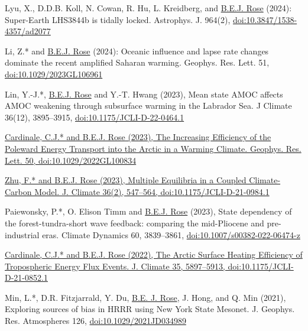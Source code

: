 \documentclass[11pt, letterpaper]{article} %
\newcommand{\years}[1]{\marginnote{\scriptsize #1}} %
\newcommand{\publink}{http://www.atmos.albany.edu/facstaff/brose/resources/Publications/}
\begin{document}
Lyu, X., D.D.B. Koll, N. Cowan, R. Hu, L. Kreidberg, and \underline{B.E.J. Rose} (2024): Super-Earth LHS3844b is tidally locked. Astrophys. J. 964(2), \href{https://doi.org/10.3847/1538-4357/ad2077}{doi:10.3847/1538-4357/ad2077}
\vspace{0.2 cm}

Li, Z.* and \underline{B.E.J. Rose} (2024): Oceanic influence and lapse rate changes dominate the recent amplified Saharan warming. Geophys. Res. Lett. 51, \href{https://doi.org/10.1029/2023GL106961}{doi:10.1029/2023GL106961}
\vspace{0.2 cm}

\years{2023}

Lin, Y.-J.*, \underline{B.E.J. Rose} and Y.-T. Hwang (2023), Mean state AMOC affects AMOC weakening through subsurface warming in the Labrador Sea. J Climate 36(12), 3895--3915, \href{https://doi.org/10.1175/JCLI-D-22-0464.1}{doi:10.1175/JCLI-D-22-0464.1}
\vspace{0.2 cm}

\href{\publink Cardinale_Rose_GRL2023.pdf}{Cardinale, C.J.* and \underline{B.E.J. Rose} (2023), The Increasing Efficiency of the Poleward Energy Transport into the Arctic in a Warming Climate. Geophys. Res. Lett. 50, doi:10.1029/2022GL100834}
\vspace{0.2 cm} 

\href{\publink Zhu_Rose_JClim2023.pdf}{Zhu, F.* and \underline{B.E.J. Rose} (2023), Multiple Equilibria in a Coupled Climate-Carbon Model. J. Climate 36(2), 547--564, doi:10.1175/JCLI-D-21-0984.1}
\vspace{0.2 cm} 

Paiewonsky, P.*, O. Elison Timm and \underline{B.E.J. Rose} (2023), State dependency of the forest-tundra-short wave feedback: comparing the mid-Pliocene and pre-industrial eras. Climate Dynamics 60, 3839--3861, \href{https://doi.org/10.1007/s00382-022-06474-z}{doi:10.1007/s00382-022-06474-z}
\vspace{0.2 cm}

\years{2022}

\href{\publink Cardinale_Rose_JClim2022.pdf}{Cardinale, C.J.* and \underline{B.E.J. Rose} (2022), The Arctic Surface Heating Efficiency of Tropospheric Energy Flux Events. J. Climate 35, 5897--5913, doi:10.1175/JCLI-D-21-0852.1}
\vspace{0.2 cm} 

\years{2021}
Min, L.*, D.R. Fitzjarrald, Y. Du, \underline{B.E. J. Rose}, J. Hong, and Q. Min (2021), Exploring sources of bias in HRRR using New York State Mesonet. J. Geophys. Res. Atmospheres 126, \href{https://doi.org/10.1029/2021JD034989}{doi:10.1029/2021JD034989}
\vspace{0.2 cm}
\end{document}
